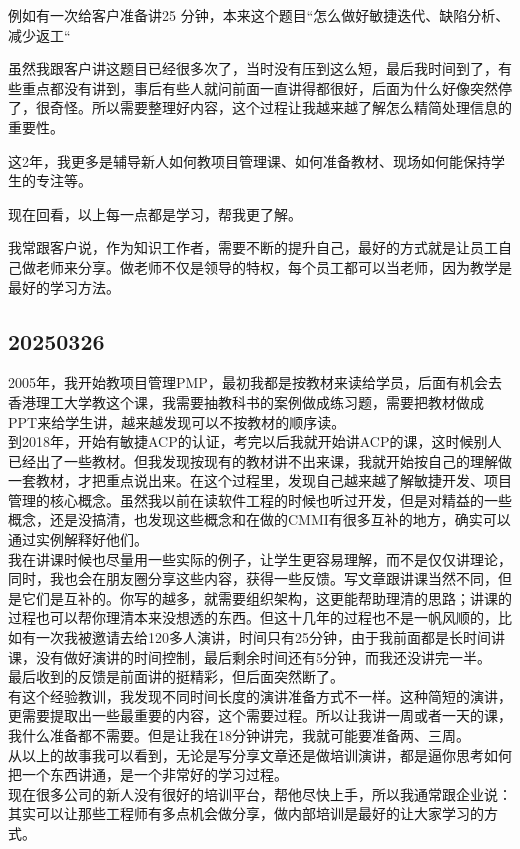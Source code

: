 例如有一次给客户准备讲25
分钟，本来这个题目``怎么做好敏捷迭代、缺陷分析、减少返工``

虽然我跟客户讲这题目已经很多次了，当时没有压到这么短，最后我时间到了，有些重点都没有讲到，事后有些人就问前面一直讲得都很好，后面为什么好像突然停了，很奇怪。所以需要整理好内容，这个过程让我越来越了解怎么精简处理信息的重要性。

这2年，我更多是辅导新人如何教项目管理课、如何准备教材、现场如何能保持学生的专注等。

现在回看，以上每一点都是学习，帮我更了解。

我常跟客户说，作为知识工作者，需要不断的提升自己，最好的方式就是让员工自己做老师来分享。做老师不仅是领导的特权，每个员工都可以当老师，因为教学是最好的学习方法。

\hypertarget{section}{%
\subsection{20250326}\label{section}}

2005年，我开始教项目管理PMP，最初我都是按教材来读给学员，后面有机会去香港理工大学教这个课，我需要抽教科书的案例做成练习题，需要把教材做成PPT来给学生讲，越来越发现可以不按教材的顺序读。\\
到2018年，开始有敏捷ACP的认证，考完以后我就开始讲ACP的课，这时候别人已经出了一些教材。但我发现按现有的教材讲不出来课，我就开始按自己的理解做一套教材，才把重点说出来。在这个过程里，发现自己越来越了解敏捷开发、项目管理的核心概念。虽然我以前在读软件工程的时候也听过开发，但是对精益的一些概念，还是没搞清，也发现这些概念和在做的CMMI有很多互补的地方，确实可以通过实例解释好他们。\\
我在讲课时候也尽量用一些实际的例子，让学生更容易理解，而不是仅仅讲理论，同时，我也会在朋友圈分享这些内容，获得一些反馈。写文章跟讲课当然不同，但是它们是互补的。你写的越多，就需要组织架构，这更能帮助理清的思路；讲课的过程也可以帮你理清本来没想透的东西。但这十几年的过程也不是一帆风顺的，比如有一次我被邀请去给120多人演讲，时间只有25分钟，由于我前面都是长时间讲课，没有做好演讲的时间控制，最后剩余时间还有5分钟，而我还没讲完一半。\\
最后收到的反馈是前面讲的挺精彩，但后面突然断了。\\
有这个经验教训，我发现不同时间长度的演讲准备方式不一样。这种简短的演讲，更需要提取出一些最重要的内容，这个需要过程。所以让我讲一周或者一天的课，我什么准备都不需要。但是让我在18分钟讲完，我就可能要准备两、三周。\\
从以上的故事我可以看到，无论是写分享文章还是做培训演讲，都是逼你思考如何把一个东西讲通，是一个非常好的学习过程。\\
现在很多公司的新人没有很好的培训平台，帮他尽快上手，所以我通常跟企业说：其实可以让那些工程师有多点机会做分享，做内部培训是最好的让大家学习的方式。


